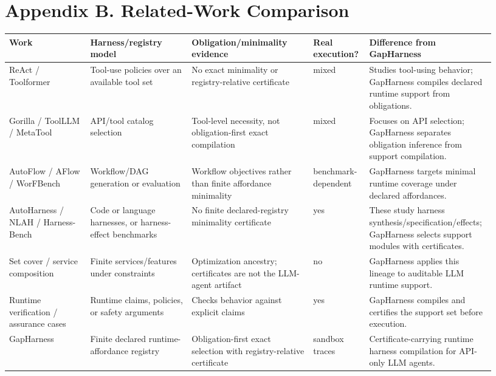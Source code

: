 \documentclass[
  10pt,
]{article}
\begin{document}
\clearpage

\section{Appendix B. Related-Work
Comparison}\label{appendix-b.-related-work-comparison}

\begin{center}
\scriptsize
{}
\label{tab:related}
\begin{tabular}{@{}p{0.16\linewidth}p{0.20\linewidth}p{0.24\linewidth}p{0.10\linewidth}p{0.23\linewidth}@{}}
\toprule
Work & Harness/registry model & Obligation/minimality evidence & Real execution? & Difference from GapHarness\\
\midrule
ReAct / Toolformer & Tool-use policies over an available tool set & No exact minimality or registry-relative certificate & mixed & Studies tool-using behavior; GapHarness compiles declared runtime support from obligations.\\
Gorilla / ToolLLM / MetaTool & API/tool catalog selection & Tool-level necessity, not obligation-first exact compilation & mixed & Focuses on API selection; GapHarness separates obligation inference from support compilation.\\
AutoFlow / AFlow / WorFBench & Workflow/DAG generation or evaluation & Workflow objectives rather than finite affordance minimality & benchmark-dependent & GapHarness targets minimal runtime coverage under declared affordances.\\
AutoHarness / NLAH / Harness-Bench & Code or language harnesses, or harness-effect benchmarks & No finite declared-registry minimality certificate & yes & These study harness synthesis/specification/effects; GapHarness selects support modules with certificates.\\
Set cover / service composition & Finite services/features under constraints & Optimization ancestry; certificates are not the LLM-agent artifact & no & GapHarness applies this lineage to auditable LLM runtime support.\\
Runtime verification / assurance cases & Runtime claims, policies, or safety arguments & Checks behavior against explicit claims & yes & GapHarness compiles and certifies the support set before execution.\\
GapHarness & Finite declared runtime-affordance registry & Obligation-first exact selection with registry-relative certificate & sandbox traces & Certificate-carrying runtime harness compilation for API-only LLM agents.\\
\bottomrule
\end{tabular}
\end{center}
\end{document}
